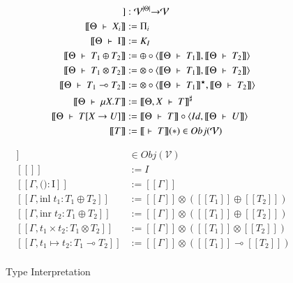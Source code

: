 \documentclass{jsarticle}
\newcommand{\semantics}[1]{[\![ #1 ]\!]}
\newcommand{\judge}[2]{[\![ #1 \;\vdash\; #2 ]\!]}
\begin{document}
\begin{figure}[H]
  \begin{minipage}[b]{0.48\columnwidth}
    \begin{align*}
      \judge{\Theta}{T}                  &: \mathcal{V}^{|\Theta|} {\bf\rightarrow} \mathcal{V} \\
      \judge{\Theta}{X_i}                &:= \Pi_i \\
      \judge{\Theta}{\mathrm{I}}         &:= K_I \\
      \judge{\Theta}{T_1\oplus{}T_2}     &:= \oplus\circ\langle\judge{\Theta}{T_1},\judge{\Theta}{T_2}\rangle \\
      \judge{\Theta}{T_1\otimes{}T_2}    &:= \otimes\circ\langle\judge{\Theta}{T_1},\judge{\Theta}{T_2}\rangle \\
      \judge{\Theta}{T_1\multimap{}T_2}  &:= \otimes\circ\langle\judge{\Theta}{T_1}^\star,\judge{\Theta}{T_2}\rangle \\
      \judge{\Theta}{\mu{X}.T}           &:= \judge{\Theta,X}{T}^\sharp \\
      \judge{\Theta}{T[X \rightarrow U]} &:= \judge{\Theta}{T}\circ\langle{Id,\judge{\Theta}{U}}\rangle \\
      \semantics{T}                      &:= \judge{}{T}(\ast) \in Obj(\mathcal{V})
    \end{align*}
    \caption{Type Interpretation}
    \label{fig:ty_interpret}
  \end{minipage}
  \begin{minipage}[b]{0.48\columnwidth}
    \begin{align*}
      \semantics{\Gamma} &\in Obj(\mathcal{V}) \\
      \semantics{} &:= I \\
      \semantics{\Gamma,\text{()}:\mathrm{I}} &:= \semantics{\Gamma} \\
      \semantics{\Gamma,\text{inl}\;t_1:T_1\oplus{}T_2} &:= \semantics{\Gamma}\otimes(\semantics{T_1}\oplus\semantics{T_2}) \\
      \semantics{\Gamma,\text{inr}\;t_2:T_1\oplus{}T_2} &:= \semantics{\Gamma}\otimes(\semantics{T_1}\oplus\semantics{T_2}) \\
      \semantics{\Gamma,t_1\times{}t_2:T_1\otimes{}T_2} &:= \semantics{\Gamma}\otimes(\semantics{T_1}\otimes\semantics{T_2}) \\
      \semantics{\Gamma,t_1\mapsto{}t_2:T_1\multimap{}T_2} &:= \semantics{\Gamma}\otimes(\semantics{T_1}\multimap\semantics{T_2}) \\

\end{align*}
\end{minipage}
\end{figure}
\end{document}
